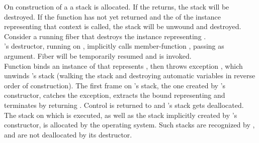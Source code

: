 \label{destruction}

On construction of a \fiber a stack is allocated. If the \entryfn\xspace returns,
the stack will be destroyed. If the function has not yet returned and the
 of the \fiber instance representing that context is called,
the stack will be unwound and destroyed.\\

Consider a running fiber  that destroys the \fiber instance
representing .\\

's destructor, running on , implicitly calls member-function
\resumewith, passing \unwindfib as
argument. Fiber  will be temporarily resumed and \unwindfib is
invoked.\\
Function \unwindfib binds an instance of \fiber that
represents , then throws exception \unwindex, which
unwinds 's stack
(walking the stack and destroying automatic variables in reverse order of
construction).
The first frame on 's stack, the one created by \fiber's constructor,
catches the exception,
extracts the bound \fiber representing  and terminates  by returning
. Control is returned to  and 's
stack gets deallocated.\\

The stack on which  is executed, as well as the stack implicitly
created by \thread's constructor, is allocated by the operating
system. Such stacks are recognized by \fiber, and are not deallocated by its
destructor.
